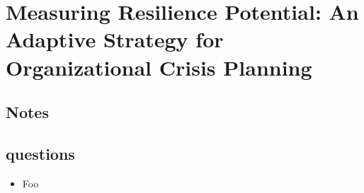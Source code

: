 \chapter{Measuring Resilience Potential: An Adaptive Strategy for Organizational Crisis Planning \cite{somers2009measuring}}
\section{Notes}

\section{questions}
\begin{itemize}
  \item Foo
\end{itemize}
